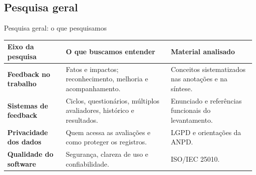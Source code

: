 \documentclass[aspectratio=169,t,xcolor=table]{beamer}
\newcommand{\head}[1]{\textcolor{UFGBlue}{\textbf{#1}}}
\begin{document}
\subsection{Pesquisa geral}
\begin{frame}{Pesquisa geral: o que pesquisamos}

\small
\begin{tabularx}{\textwidth}{@{}L{.24\textwidth}YL{.28\textwidth}@{}}
\toprule\head{Eixo da pesquisa} & \head{O que buscamos entender} & \head{Material analisado}\\\midrule
\textbf{Feedback no trabalho} & Fatos e impactos; reconhecimento, melhoria e acompanhamento. & Conceitos sistematizados nas anotações e na síntese.\\[.12cm]
\textbf{Sistemas de feedback} & Ciclos, questionários, múltiplos avaliadores, histórico e resultados. & Enunciado e referências funcionais do levantamento.\\[.12cm]
\textbf{Privacidade dos dados} & Quem acessa as avaliações e como proteger os registros. & LGPD e orientações da ANPD.\\[.12cm]
\textbf{Qualidade do software} & Segurança, clareza de uso e confiabilidade. & ISO/IEC 25010.\\\bottomrule
\end{tabularx}

\end{frame}
\end{document}
